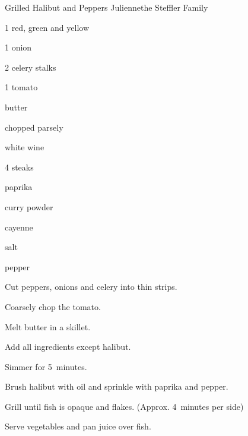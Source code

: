 \begin{recipe}{Grilled Halibut and Peppers Julienne}{the Steffler Family}{}

\begin{ingredients}
\item 1 red, green and yellow 
\item 1 onion
\item 2 celery stalks
\item 1 tomato
\item {} butter
\item {} chopped parsely
\item \C{\twothird} white wine
\item 4  steaks
\item paprika
\item curry powder
\item cayenne
\item salt
\item pepper
\end{ingredients}

\begin{directions}
\item Cut peppers, onions and celery into thin strips.
\item Coarsely chop the tomato.
\item Melt butter in a skillet.
\item Add all ingredients except halibut.
\item Simmer for 5~minutes.
\item Brush halibut with oil and sprinkle with paprika and pepper.
\item Grill until fish is opaque and flakes. (Approx. 4~minutes per side)
\item Serve vegetables and pan juice over fish.
\end{directions}
\end{recipe}
